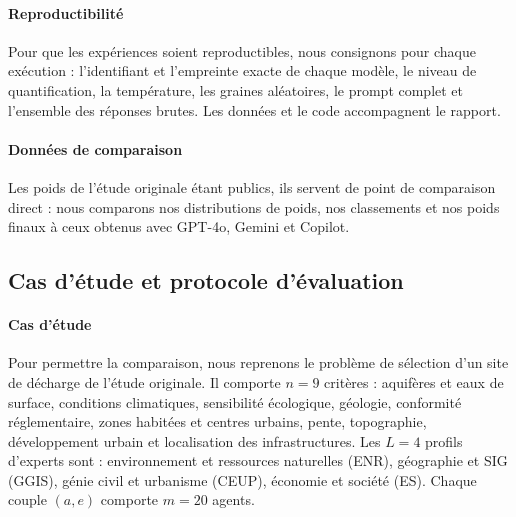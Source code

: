\documentclass[11pt,a4paper]{article}
\begin{document}
\paragraph{Reproductibilité} Pour que les expériences soient reproductibles, nous consignons pour chaque exécution : l'identifiant et l'empreinte exacte de chaque modèle, le niveau de quantification, la température, les graines aléatoires, le prompt complet et l'ensemble des réponses brutes. Les données et le code accompagnent le rapport.

\paragraph{Données de comparaison} Les poids de l'étude originale étant publics, ils servent de point de comparaison direct : nous comparons nos distributions de poids, nos classements et nos poids finaux à ceux obtenus avec GPT-4o, Gemini et Copilot.

\subsection{Cas d'étude et protocole d'évaluation}\label{sec:protocole}

\paragraph{Cas d'étude} Pour permettre la comparaison, nous reprenons le problème de sélection d'un site de décharge de l'étude originale. Il comporte $n=9$ critères : aquifères et eaux de surface, conditions climatiques, sensibilité écologique, géologie, conformité réglementaire, zones habitées et centres urbains, pente, topographie, développement urbain et localisation des infrastructures. Les $L=4$ profils d'experts sont : environnement et ressources naturelles (ENR), géographie et SIG (GGIS), génie civil et urbanisme (CEUP), économie et société (ES). Chaque couple $(a,e)$ comporte $m=20$ agents.
\end{document}
